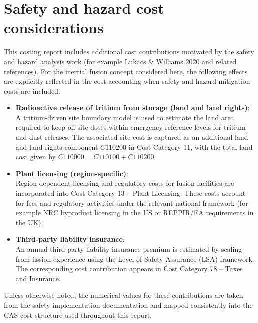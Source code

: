 \ifsafetycosts
\section*{Safety and hazard cost considerations}

This costing report includes additional cost contributions motivated by the
safety and hazard analysis work (for example Lukacs \& Williams 2020 and
related references). For the inertial fusion concept considered here, the
following effects are explicitly reflected in the cost accounting when
safety and hazard mitigation costs are included:

\begin{itemize}
  \item \textbf{Radioactive release of tritium from storage (land and land rights)}:\\
  A tritium-driven site boundary model is used to estimate the land area
  required to keep off-site doses within emergency reference levels for
  tritium and dust releases. The associated site cost is captured as an
  additional land and land-rights component \(C110200\) in Cost Category 11,
  with the total land cost given by \(C110000 = C110100 + C110200\).

  \item \textbf{Plant licensing (region-specific)}:\\
  Region-dependent licensing and regulatory costs for fusion facilities
  are incorporated into Cost Category 13 – Plant Licensing. These costs
  account for fees and regulatory activities under the relevant national
  framework (for example NRC byproduct licensing in the US or REPPIR/EA
  requirements in the UK).

  \item \textbf{Third-party liability insurance}:\\
  An annual third-party liability insurance premium is estimated by
  scaling from fission experience using the Level of Safety Assurance
  (LSA) framework. The corresponding cost contribution appears in
  Cost Category 78 – Taxes and Insurance.
\end{itemize}

Unless otherwise noted, the numerical values for these contributions are
taken from the safety implementation documentation and mapped consistently
into the CAS cost structure used throughout this report.
\fi

